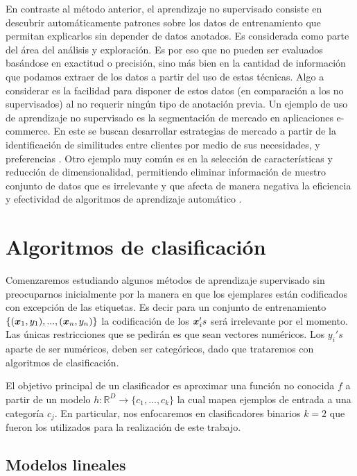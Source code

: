 En contraste al método anterior, el aprendizaje no supervisado consiste en
descubrir automáticamente patrones sobre los datos de entrenamiento que permitan
explicarlos sin depender de datos anotados. Es considerada como parte del área
del análisis y exploración. Es por eso que no pueden ser evaluados basándose en
exactitud o precisión, sino más bien en la cantidad de información que podamos
extraer de los datos a partir del uso de estas técnicas. Algo a considerar es la
facilidad para disponer de estos datos (en comparación a los no supervisados) al
no requerir ningún tipo de anotación previa.
Un ejemplo de uso de aprendizaje no supervisado es la segmentación de mercado en
aplicaciones e-commerce. En este se buscan desarrollar estrategias de mercado a
partir de la identificación de similitudes entre clientes por medio de sus
necesidades, y preferencias \citep{Tiwari-2018}. Otro ejemplo muy común es en la
selección de características y reducción de dimensionalidad, permitiendo eliminar
información de nuestro conjunto de datos que es irrelevante y que afecta de
manera negativa la eficiencia y efectividad de algoritmos de aprendizaje
automático \citep{Farahat-2013}.

\section{Algoritmos de clasificación}
\label{lit:algorithms}

Comenzaremos estudiando algunos métodos de aprendizaje supervisado sin
preocuparnos inicialmente por la manera en que los ejemplares están codificados
con excepción de las etiquetas. Es decir para un conjunto de entrenamiento
$\{(\boldsymbol{x}_1, y_1), ..., (\boldsymbol{x}_n, y_n)\}$ la codificación de los
$\boldsymbol{x}_i's$ será irrelevante por el momento. Las únicas restricciones que se
pedirán es que sean vectores numéricos. Los $y_i's$ aparte de ser numéricos, deben
ser categóricos, dado que trataremos con algoritmos de clasificación.

El objetivo principal de un clasificador es aproximar una función no conocida
$f$ a partir de un modelo $h: \mathbb{R}^D \rightarrow \{c_1,..., c_k\}$ la cual
mapea ejemplos de entrada a una categoría $c_j$. En particular, nos enfocaremos
en clasificadores binarios $k = 2$ que fueron los utilizados para la realización
de este trabajo.

\subsection{Modelos lineales}

